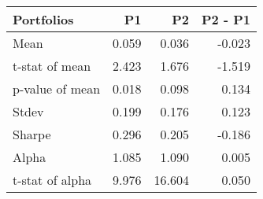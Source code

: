 \begin{tabular}{lrrr}
\toprule
Portfolios & P1 & P2 & P2 - P1 \\
\midrule
Mean & 0.059 & 0.036 & -0.023 \\
t-stat of mean & 2.423 & 1.676 & -1.519 \\
p-value of mean & 0.018 & 0.098 & 0.134 \\
Stdev & 0.199 & 0.176 & 0.123 \\
Sharpe & 0.296 & 0.205 & -0.186 \\
Alpha & 1.085 & 1.090 & 0.005 \\
t-stat of alpha & 9.976 & 16.604 & 0.050 \\
\bottomrule
\end{tabular}
